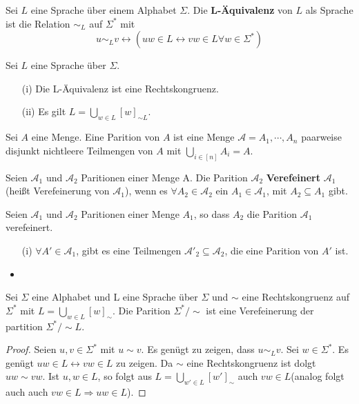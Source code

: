  Sei $L$ eine Sprache über einem Alphabet $\Sigma$. Die \textbf{L-Äquivalenz} von $L$ als Sprache ist die Relation $\sim_L$ auf $\Sigma^*$ mit \[u \sim_L v \leftrightarrow (uw \in L \leftrightarrow vw \in L \forall w \in \Sigma^*)\] 

 Sei $L$ eine Sprache über $\Sigma$. 
\begin{itemize}
  \item [(i)] Die L-Äquivalenz ist eine Rechtskongruenz.
  \item [(ii)] Es gilt $L = \bigcup \limits_{w \in L}[w]_{\sim L}$.
\end{itemize}

 Sei $A$ eine Menge. Eine Parition von $A$ ist eine Menge $\mathcal{A} = {A_1, \cdots, A_n}$ paarweise disjunkt nichtleere Teilmengen von $A$ mit $\bigcup \limits_{i \in [n]} A_i = A$.

 Seien $\mathcal{A}_1$ und $\mathcal{A}_2$ Paritionen einer Menge A. Die Parition $\mathcal{A}_2$ \textbf{Verefeinert} $\mathcal{A}_1$ (heißt Verefeinerung von $\mathcal{A}_1$), wenn es $\forall A_2 \in \mathcal{A}_2$ ein $A_1 \in \mathcal{A}_1$, mit $A_2 \subseteq A_1$ gibt.

 Seien $\mathcal{A}_1$ und $\mathcal{A}_2$ Paritionen einer Menge $A_1$, so dass $A_2$ die Parition $\mathcal{A}_1$ verefeinert.
\begin{itemize}
  \item [(i)] $\forall A' \in \mathcal{A}_1$, gibt es eine Teilmengen $\mathcal{A}'_2 \subseteq \mathcal{A}_2$, die eine Parition von $A'$ ist.
  \item 
\end{itemize}

 Sei $\Sigma$ eine Alphabet und L eine Sprache über $\Sigma$ und $\sim$ eine Rechtskongruenz auf $\Sigma^*$ mit $L = \bigcup \limits_{w \in L} [w]_{\sim}$. Die Parition $\Sigma^*/\sim$ ist eine Verefeinerung der partition $\Sigma^*/ \sim L$.

\begin{proof}
  Seien $u, v \in \Sigma^*$ mit $u \sim v$. Es genügt zu zeigen, dass $u \sim_{L} v$. Sei $w \in \Sigma^*$. Es genügt $uw \in L \leftrightarrow vw \in L$ zu zeigen. Da $\sim$ eine Rechtskongruenz ist dolgt $uw \sim vw$. Ist $u, w \in L$, so folgt aus $L = \bigcup \limits_{w' \in L} [w']_\sim$ auch $vw \in L$(analog folgt auch auch $vw \in L \Rightarrow uw \in L$).
\end{proof}

